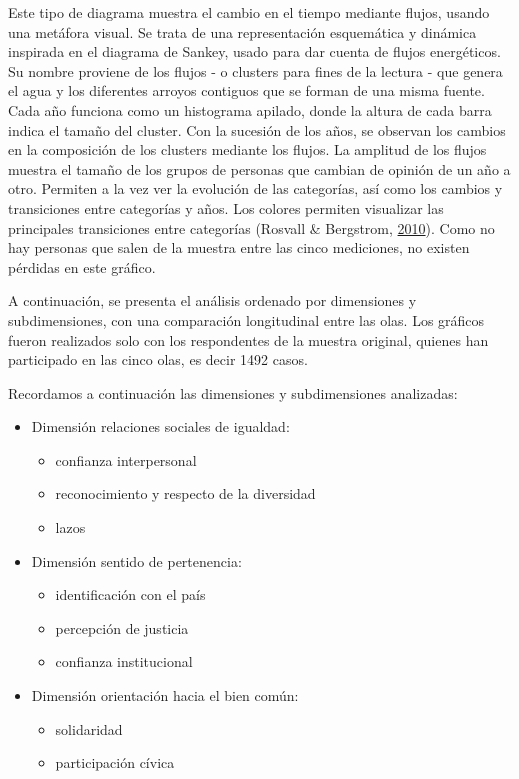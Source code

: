 \documentclass[
  12pt,
]{book}
\providecommand{\tightlist}{%
  \setlength{\itemsep}{0pt}\setlength{\parskip}{0pt}}
\begin{document}
Este tipo de diagrama muestra el cambio en el tiempo mediante flujos, usando una metáfora visual. Se trata de una representación esquemática y dinámica inspirada en el diagrama de Sankey, usado para dar cuenta de flujos energéticos. Su nombre proviene de los flujos - o clusters para fines de la lectura - que genera el agua y los diferentes arroyos contiguos que se forman de una misma fuente. Cada año funciona como un histograma apilado, donde la altura de cada barra indica el tamaño del cluster. Con la sucesión de los años, se observan los cambios en la composición de los clusters mediante los flujos. La amplitud de los flujos muestra el tamaño de los grupos de personas que cambian de opinión de un año a otro. Permiten a la vez ver la evolución de las categorías, así como los cambios y transiciones entre categorías y años. Los colores permiten visualizar las principales transiciones entre categorías (Rosvall \& Bergstrom, \protect\hyperlink{ref-rosvall_mapping_2010}{2010}). Como no hay personas que salen de la muestra entre las cinco mediciones, no existen pérdidas en este gráfico.

A continuación, se presenta el análisis ordenado por dimensiones y subdimensiones, con una comparación longitudinal entre las olas. Los gráficos fueron realizados solo con los respondentes de la muestra original, quienes han participado en las cinco olas, es decir 1492 casos.

Recordamos a continuación las dimensiones y subdimensiones analizadas:

\begin{itemize}
\tightlist
\item
  Dimensión relaciones sociales de igualdad:

  \begin{itemize}
  \tightlist
  \item
    confianza interpersonal
  \item
    reconocimiento y respecto de la diversidad
  \item
    lazos
  \end{itemize}
\item
  Dimensión sentido de pertenencia:

  \begin{itemize}
  \tightlist
  \item
    identificación con el país
  \item
    percepción de justicia
  \item
    confianza institucional
  \end{itemize}
\item
  Dimensión orientación hacia el bien común:

  \begin{itemize}
  \tightlist
  \item
    solidaridad
  \item
    participación cívica
  \end{itemize}
\end{itemize}
\end{document}
